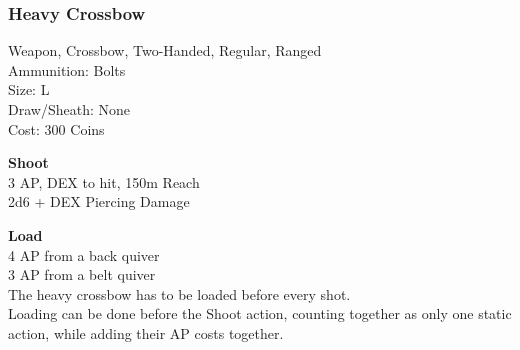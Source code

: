 \subsubsection{Heavy Crossbow}\label{weapon:heavyCrossbow}
Weapon, Crossbow, Two-Handed, Regular, Ranged\\
Ammunition: Bolts\\
Size: L\\
Draw/Sheath: None\\
Cost: 300 Coins

\textbf{Shoot} \\
3 AP, DEX to hit, 150m Reach\\
2d6 + \texttimes DEX Piercing Damage

\textbf{Load} \\
4 AP from a back quiver\\
3 AP from a belt quiver\\
The heavy crossbow has to be loaded before every shot.\\
Loading can be done before the Shoot action, counting together as only one static action, while adding their AP costs together.

